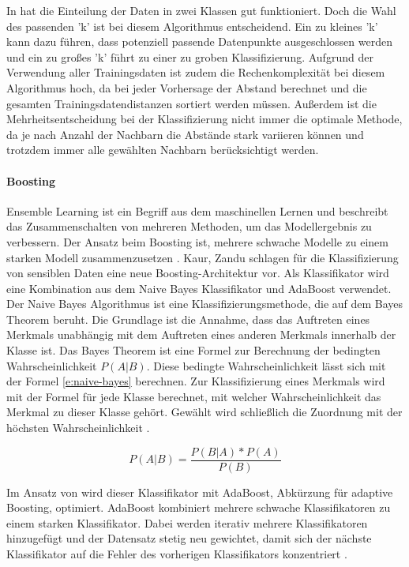 In \cite{Zardari.2014} hat die Einteilung der Daten in zwei Klassen gut funktioniert. Doch die Wahl des passenden 'k' ist bei diesem Algorithmus entscheidend. Ein zu kleines 'k' kann dazu führen, dass potenziell passende Datenpunkte ausgeschlossen werden und ein zu großes 'k' führt zu einer zu groben Klassifizierung. Aufgrund der Verwendung aller Trainingsdaten ist zudem die Rechenkomplexität bei diesem Algorithmus hoch, da bei jeder Vorhersage der Abstand berechnet und die gesamten Trainingsdatendistanzen sortiert werden müssen. Außerdem ist die Mehrheitsentscheidung bei der Klassifizierung nicht immer die optimale Methode, da je nach Anzahl der Nachbarn die Abstände stark variieren können und trotzdem immer alle gewählten Nachbarn berücksichtigt werden.

\paragraph{Boosting}
Ensemble Learning ist ein Begriff aus dem maschinellen Lernen und beschreibt das Zusammenschalten von mehreren Methoden, um das Modellergebnis zu verbessern. Der Ansatz beim Boosting ist, mehrere schwache Modelle zu einem starken Modell zusammenzusetzen \cite{Frochte.2018c}.
Kaur, Zandu \cite{Kaur.2016} schlagen für die Klassifizierung von sensiblen Daten eine neue Boosting-Architektur vor. Als Klassifikator wird eine Kombination aus dem Naive Bayes Klassifikator und AdaBoost verwendet. Der Naive Bayes Algorithmus ist eine Klassifizierungsmethode, die auf dem Bayes Theorem beruht. Die Grundlage ist die Annahme, dass das Auftreten eines Merkmals unabhängig mit dem Auftreten eines anderen Merkmals innerhalb der Klasse ist. Das Bayes Theorem ist eine Formel zur Berechnung der bedingten Wahrscheinlichkeit ${P(A|B)}$. Diese bedingte Wahrscheinlichkeit lässt sich mit der Formel \ref{e:naive-bayes} berechnen. Zur Klassifizierung eines Merkmals wird mit der Formel für jede Klasse berechnet, mit welcher Wahrscheinlichkeit das Merkmal zu dieser Klasse gehört. Gewählt wird schließlich die Zuordnung mit der höchsten Wahrscheinlichkeit \cite{Frochte.2018d}.

\begin{equation}
  \label{e:naive-bayes}
  P(A|B) = \frac{P(B|A) * P(A)}{P(B)}
\end{equation}

Im Ansatz von \cite{Kaur.2016} wird dieser Klassifikator mit AdaBoost, Abkürzung für adaptive Boosting, optimiert. AdaBoost kombiniert mehrere schwache Klassifikatoren zu einem starken Klassifikator. Dabei werden iterativ mehrere Klassifikatoren hinzugefügt und der Datensatz stetig neu gewichtet, damit sich der nächste Klassifikator auf die Fehler des vorherigen Klassifikators konzentriert \cite{Frochte.2018c}.

